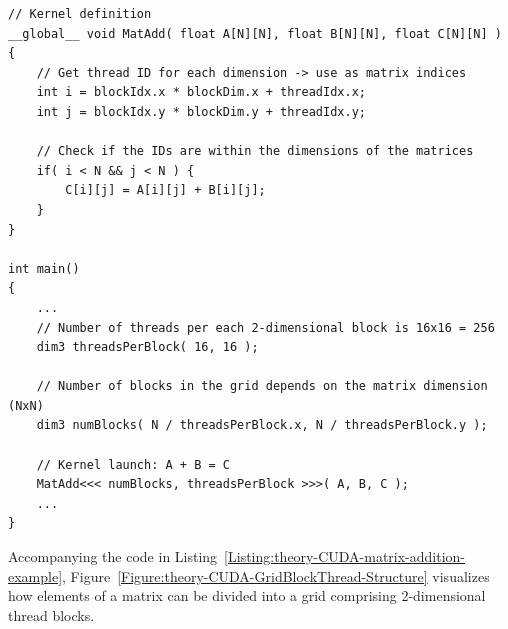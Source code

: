 \begin{lstlisting}[caption={Example of C++ pseudocode of a kernel that adds two matrices using 2-dimensional thread blocks. Since each thread has a unique \code{globalID} for each of two dimensions, then those IDs can be used as indices for adding matrix elements. This simple example does not take into account the allocation and copying of data from host to the device. Taken from Nvidia's \emph{CUDA C++ Programming Guide} \cite{NVIDIAMay2022}.},label={Listing:theory-CUDA-matrix-addition-example}]
// Kernel definition
__global__ void MatAdd( float A[N][N], float B[N][N], float C[N][N] )
{
	// Get thread ID for each dimension -> use as matrix indices
	int i = blockIdx.x * blockDim.x + threadIdx.x;
	int j = blockIdx.y * blockDim.y + threadIdx.y;
	
	// Check if the IDs are within the dimensions of the matrices
	if( i < N && j < N ) {
		C[i][j] = A[i][j] + B[i][j];
	}
}

int main()
{
	...
	// Number of threads per each 2-dimensional block is 16x16 = 256
	dim3 threadsPerBlock( 16, 16 );
	
	// Number of blocks in the grid depends on the matrix dimension (NxN)
	dim3 numBlocks( N / threadsPerBlock.x, N / threadsPerBlock.y );
	
	// Kernel launch: A + B = C
	MatAdd<<< numBlocks, threadsPerBlock >>>( A, B, C );
	...
}
\end{lstlisting}

Accompanying the code in Listing~\ref{Listing:theory-CUDA-matrix-addition-example}, Figure~\ref{Figure:theory-CUDA-GridBlockThread-Structure} visualizes how elements of a matrix can be divided into a grid comprising 2-dimensional thread blocks.

